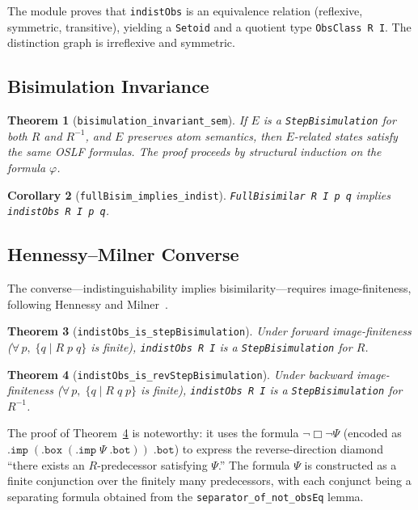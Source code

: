 \documentclass[11pt]{article}
\newtheorem{theorem}{Theorem}[section]
\newtheorem{corollary}[theorem]{Corollary}
\begin{document}
The module proves that \texttt{indistObs} is an equivalence relation
(reflexive, symmetric, transitive), yielding a \texttt{Setoid} and a
quotient type \texttt{ObsClass R I}.  The distinction graph is
irreflexive and symmetric.

\subsection{Bisimulation Invariance}

\begin{theorem}[\texttt{bisimulation\_invariant\_sem}]
If $E$ is a \texttt{StepBisimulation} for both $R$ and $R^{-1}$, and
$E$ preserves atom semantics, then $E$-related states satisfy the same
OSLF formulas.  The proof proceeds by structural induction on the
formula $\varphi$.
\end{theorem}

\begin{corollary}[\texttt{fullBisim\_implies\_indist}]
\texttt{FullBisimilar R I p q} implies \texttt{indistObs R I p q}.
\end{corollary}

\subsection{Hennessy--Milner Converse}

The converse---indistinguishability implies bisimilarity---requires
image-finiteness, following Hennessy and Milner~\cite{HennessyMilner1985}.

\begin{theorem}[\texttt{indistObs\_is\_stepBisimulation}]\label{thm:hm-fwd}
Under forward image-finiteness ($\forall\,p,\;\{q \mid R\;p\;q\}$ is
finite), \texttt{indistObs R I} is a \texttt{StepBisimulation} for $R$.
\end{theorem}

\begin{theorem}[\texttt{indistObs\_is\_revStepBisimulation}]\label{thm:hm-rev}
Under backward image-finiteness ($\forall\,p,\;\{q \mid R\;q\;p\}$ is
finite), \texttt{indistObs R I} is a \texttt{StepBisimulation} for
$R^{-1}$.
\end{theorem}

The proof of Theorem~\ref{thm:hm-rev} is noteworthy: it uses the
formula $\neg\Box\neg\Psi$ (encoded as
$\texttt{.imp}\;(\texttt{.box}\;(\texttt{.imp}\;\Psi\;\texttt{.bot}))\;\texttt{.bot}$)
to express the reverse-direction diamond ``there exists an $R$-predecessor
satisfying $\Psi$.''  The formula $\Psi$ is constructed as a finite
conjunction over the finitely many predecessors, with each conjunct
being a separating formula obtained from the
\texttt{separator\_of\_not\_obsEq} lemma.
\end{document}
